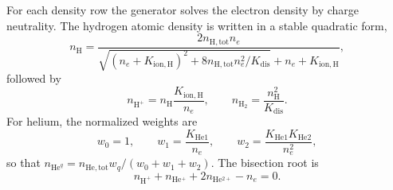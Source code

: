 \documentclass[11pt]{article}
\begin{document}
For each density row the generator solves the electron density by charge
neutrality.  The hydrogen atomic density is written in a stable quadratic form,
\begin{equation}
  n_{\mathrm H} =
  \frac{2n_{\mathrm{H,tot}}n_e}
  {\sqrt{(n_e+K_{\mathrm{ion,H}})^2+
  8n_{\mathrm{H,tot}}n_e^2/K_{\mathrm{dis}}}
  +n_e+K_{\mathrm{ion,H}}},
\end{equation}
followed by
\begin{equation}
  n_{\mathrm{H^+}} = n_{\mathrm H}\frac{K_{\mathrm{ion,H}}}{n_e},
  \qquad
  n_{\mathrm{H_2}} = \frac{n_{\mathrm H}^2}{K_{\mathrm{dis}}}.
\end{equation}
For helium, the normalized weights are
\begin{equation}
  w_0=1,\qquad
  w_1=\frac{K_{\mathrm{He1}}}{n_e},\qquad
  w_2=\frac{K_{\mathrm{He1}}K_{\mathrm{He2}}}{n_e^2},
\end{equation}
so that $n_{\mathrm{He}^q}=n_{\mathrm{He,tot}}w_q/(w_0+w_1+w_2)$.
The bisection root is
\begin{equation}
  n_{\mathrm{H^+}}+n_{\mathrm{He^+}}+2n_{\mathrm{He^{2+}}}-n_e=0.
\end{equation}
\end{document}
